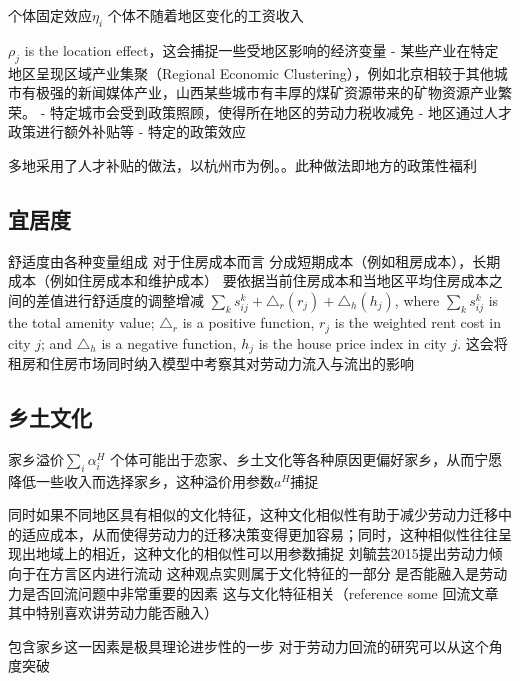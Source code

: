 \documentclass[a4paper,12pt]{article}
\begin{document}
个体固定效应$\eta_i$
个体不随着地区变化的工资收入



$\rho_j$ is the location effect，这会捕捉一些受地区影响的经济变量
- 某些产业在特定地区呈现区域产业集聚（Regional Economic Clustering），例如北京相较于其他城市有极强的新闻媒体产业，山西某些城市有丰厚的煤矿资源带来的矿物资源产业繁荣。
- 特定城市会受到政策照顾，使得所在地区的劳动力税收减免
- 地区通过人才政策进行额外补贴等
- 特定的政策效应

多地采用了人才补贴的做法，以杭州市为例。。此种做法即地方的政策性福利

\subsection{宜居度}
舒适度由各种变量组成
对于住房成本而言
分成短期成本（例如租房成本），长期成本（例如住房成本和维护成本）
要依据当前住房成本和当地区平均住房成本之间的差值进行舒适度的调整增减
$\sum\limits_{k}s^k_{ij}+\triangle_r(r_j)+\triangle_h(h_j)$, where $\sum\limits_{k}s^k_{ij}$ is the total amenity value; $\triangle_r$ is a positive function, $r_j$ is the weighted rent cost in city $j$; and $\triangle_h$ is a negative function, $h_j$ is the house price index in city $j$.
这会将租房和住房市场同时纳入模型中考察其对劳动力流入与流出的影响


\subsection{乡土文化}
家乡溢价$\sum\limits_{i}\alpha^{H}_{i}$
个体可能出于恋家、乡土文化等各种原因更偏好家乡，从而宁愿降低一些收入而选择家乡，这种溢价用参数$a^H$捕捉

同时如果不同地区具有相似的文化特征，这种文化相似性有助于减少劳动力迁移中的适应成本，从而使得劳动力的迁移决策变得更加容易；同时，这种相似性往往呈现出地域上的相近，这种文化的相似性可以用参数捕捉
刘毓芸2015提出劳动力倾向于在方言区内进行流动 这种观点实则属于文化特征的一部分
是否能融入是劳动力是否回流问题中非常重要的因素 这与文化特征相关（reference some 回流文章 其中特别喜欢讲劳动力能否融入）

包含家乡这一因素是极具理论进步性的一步 对于劳动力回流的研究可以从这个角度突破
\end{document}
